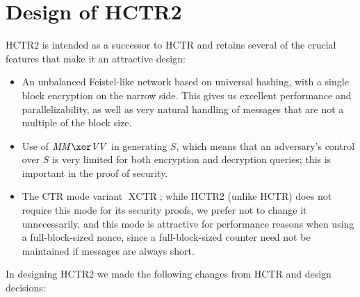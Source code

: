 \documentclass[letterpaper,11pt]{article}
\newcommand*{\MM}{\mathit{MM}}
\newcommand*{\VV}{\mathit{VV}}
\DeclareMathOperator{\XCTR}{XCTR}
\begin{document}
\section{Design of HCTR2}
HCTR2 is intended as a successor to HCTR and retains several of the
crucial features that make it an attractive design:
\begin{itemize}
    \item An unbalanced Feistel-like network based on universal
    hashing, with a single block encryption on the narrow side.
    This gives us excellent performance and parallelizability,
    as well as very natural handling of messages that are not
    a multiple of the block size.
    \item Use of \(\MM \xor \VV\) in generating \(S\), which means
    that an adversary's control over \(S\) is very limited for both
    encryption and decryption queries; this is important in the
    proof of security.
    \item The CTR mode variant \(\XCTR\); while HCTR2 (unlike HCTR)
    does not require this mode for its security proofs, 
    we prefer not to change it unnecessarily, and this mode is
    attractive for performance reasons when using a full-block-sized
    nonce, since a full-block-sized counter need not be maintained
    if messages are always short.
\end{itemize}

In designing HCTR2 we made the following changes from HCTR and design decisions:
\end{document}

